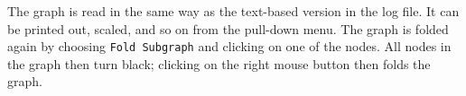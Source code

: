 \documentclass[12pt]{book}
\begin{document}
The graph is read in the same way as the text-based version in the log
file. It can be printed out, scaled, and so on from the pull-down
menu. The graph is folded again by choosing {\tt Fold Subgraph} and
clicking on one of the nodes. All nodes in the graph then turn black;
clicking on the right mouse button then folds the graph.



\end{document}
